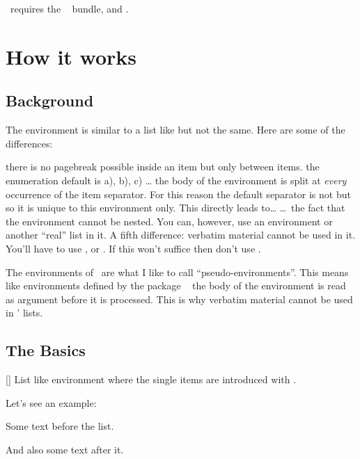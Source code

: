 \documentclass{tasks-manual}
\begin{document}
\Tasks\ requires the ~\cite{bnd:l3kernel} bundle,
 and .

\section{How it works}
\subsection{Background}
The  environment is similar to a list like  but not
the same.  Here are some of the differences:
\begin{tasks}[style=enumerate]
  \task there is no pagebreak possible inside an item but only between items.
  \task the enumeration default is a), b), c) \ldots
  \task the body of the  environment is split at \emph{every}
    occurrence of the item separator.  For this reason the default separator
    is not  but  so it is unique to this environment only.
    This directly leads to\ldots
  \task \ldots\ the fact that the  environment cannot be nested.
    You can, however, use an  environment or another
    \enquote{real} list in it.
  \task A fifth difference: verbatim material cannot be used in it.  You'll
    have to use ,  or .  If this
    won't suffice then don't use .
\end{tasks}

\begin{bewareofthedog}
  The environments of \Tasks\ are what I like to call
  \enquote{pseudo-environments}.  This means like environments defined by the
  package ~\cite{pkg:environ} the body of the environment is read
  as argument before it is processed.  This is why verbatim material cannot be
  used in \Tasks' lists.
\end{bewareofthedog}

\subsection{The Basics}
\begin{environments}
  []
    List like environment where the single items are introduced with
    .
\end{environments}
Let's see an example:
\begin{example}
  Some text before the list.
  \begin{tasks}
    \task \Sample
    \task \Sample
    \task \Sample
  \end{tasks}
  And also some text after it.
\end{example}
\end{document}
